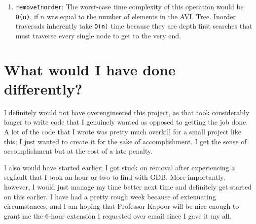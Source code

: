 \documentclass[12pt, letterpaper]{article}
\begin{document}
\begin{enumerate}
    \item \texttt{removeInorder}: The worst-case time complexity of this operation would be \texttt{O(n)}, if $ n $ was equal to the number of elements in the AVL Tree. Inorder traversals inherently take \texttt{O(n)} time because they are depth first searches that must traverse every single node to get to the very end.
\end{enumerate}

\section*{What would I have done differently?}

I definitely would not have overengineered this project, as that took considerably longer to write code that I genuinely wanted as opposed to getting the job done. A lot of the code that I wrote was pretty much overkill for a small project like this; I just wanted to create it for the sake of accomplishment. I get the sense of accomplishment but at the cost of a late penalty.
\medskip

I also would have started earlier; I got stuck on removal after experiencing a segfault that I took an hour or two to find with GDB. More importantly, however, I would just manage my time better next time and definitely get started on this earlier. I have had a pretty rough week because of extenuating circumstances, and I am hoping that Professor Kapoor will be nice enough to grant me the 6-hour extension I requested over email since I gave it my all.
\end{document}
